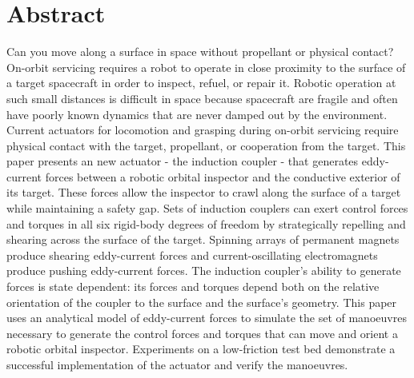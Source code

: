 \documentclass[10pt]{article}
\begin{document}
\listoftodos
\todototoc
{}
\section{Abstract}
Can you move along a surface in space without propellant or physical contact? On-orbit servicing requires a robot to operate in close proximity to the surface of a target spacecraft in order to inspect, refuel, or repair it.  Robotic operation at such small distances is difficult in space because spacecraft are fragile and often have poorly known dynamics that are never damped out by the environment. Current actuators for locomotion and grasping during on-orbit servicing require physical contact with the target, propellant, or cooperation from the target.  
%
This paper presents an new actuator - the induction coupler - that generates eddy-current forces between a robotic orbital inspector and the conductive exterior of its target. These forces allow the inspector to crawl along the surface of a target while maintaining a safety gap. Sets of induction couplers can exert control forces and torques in all six rigid-body degrees of freedom by strategically repelling and shearing across the surface of the target. Spinning arrays of permanent magnets produce shearing eddy-current forces and current-oscillating electromagnets produce pushing eddy-current forces. 
%
The induction coupler's ability to generate forces is state dependent: its forces and torques depend both on the relative orientation of the coupler to the surface and the surface's geometry. This paper uses an analytical model of eddy-current forces to simulate the set of manoeuvres necessary to generate the control forces and torques that can move and orient a robotic orbital inspector. Experiments on a low-friction test bed demonstrate a successful implementation of the actuator and verify the manoeuvres.       
\end{document}
